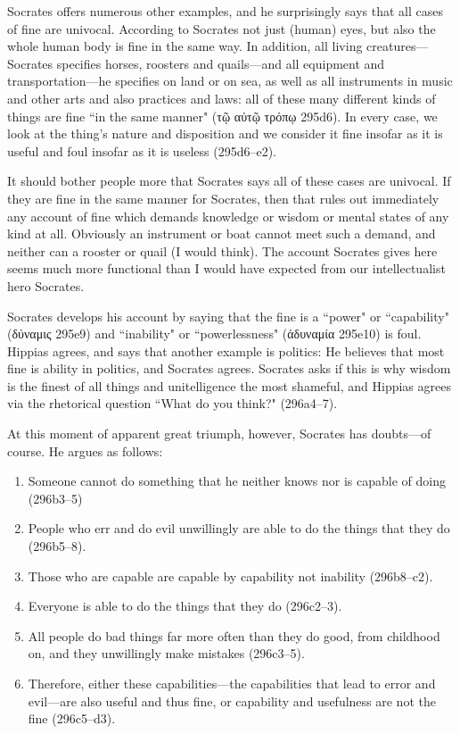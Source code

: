 \documentclass[11pt]{article}
\begin{document}
Socrates offers numerous other examples, and he surprisingly says that all
cases of fine are univocal.  According to Socrates not just (human) eyes,
but also the whole human body is fine in the same way.  In addition, all
living creatures---Socrates specifies horses, roosters and quails---and all
equipment and transportation---he specifies on land or on sea, as well as
all instruments in music and other arts and also practices and laws: all of
these many different kinds of things are fine ``in the same manner" ({\g τῷ
αὐτῷ τρόπῳ} 295d6).  In every case, we look at the thing's nature and
disposition and we consider it fine insofar as it is useful and foul
insofar as it is useless (295d6--e2).

It should bother people more that Socrates says all of these cases are
univocal.  If they are fine in the same manner for Socrates, then that
rules out immediately any account of fine which demands knowledge or wisdom
or mental states of any kind at all.  Obviously an instrument or boat
cannot meet such a demand, and neither can a rooster or quail (I would
think).  The account Socrates gives here seems much more functional than
I would have expected from our intellectualist hero Socrates.

Socrates develops his account by saying that the fine is a ``power" or
``capability" ({\g δύναμις} 295e9) and ``inability" or ``powerlessness"
({\g ἀδυναμία} 295e10) is foul.  Hippias agrees, and says that another
example is politics: He believes that most fine is ability in politics, and
Socrates agrees.  Socrates asks if this is why wisdom is the finest of all
things and unitelligence the most shameful, and Hippias agrees via the
rhetorical question ``What do you think?" (296a4--7).

At this moment of apparent great triumph, however, Socrates has doubts---of
course.  He argues as follows:

\begin{enumerate}

    \item Someone cannot do something that he neither knows nor is capable
        of doing (296b3--5)

    \item People who err and do evil unwillingly are able to do the things
        that they do (296b5--8).

    \item Those who are capable are capable by capability not inability
        (296b8--c2).

    \item Everyone is able to do the things that they do (296c2--3).

    \item All people do bad things far more often than they do good, from
        childhood on, and they unwillingly make mistakes (296c3--5).

    \item Therefore, either these capabilities---the capabilities that lead
        to error and evil---are also useful and thus fine, or capability
        and usefulness are not the fine (296c5--d3).

\end{enumerate}
\end{document}
